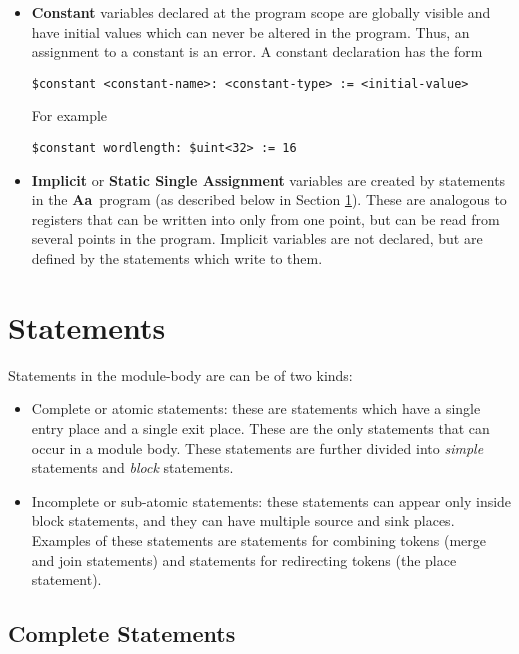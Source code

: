\documentclass{article}
\newcommand{\Aa}{{\bf Aa}~}
\begin{document}
\begin{itemize}
\item {\bf Constant} variables declared at
the program scope are globally visible and have
initial values which can never be altered in the program.
Thus, an assignment to a constant is an error.
A constant declaration has the form
\begin{verbatim}
$constant <constant-name>: <constant-type> := <initial-value>
\end{verbatim}
For example
\begin{verbatim}
$constant wordlength: $uint<32> := 16
\end{verbatim}
\item {\bf Implicit} or {\bf Static Single Assignment}
variables are created by statements in the \Aa program
(as described below in Section \ref{sec:Statements}).
These are analogous to registers that can be written
into only from one point,  but can be
read from several points in the program.
Implicit variables are not declared, but are defined
by the statements which write to them.
\end{itemize} 


\section{Statements} \label{sec:Statements}
 
Statements in the module-body are can be of two kinds:
\begin{itemize}
\item Complete or atomic statements: these are statements
which have a single
entry place and a single exit place.  These are
the only statements that can occur in a module body.
These statements are further divided into 
{\em simple} statements and {\em block} statements.
\item Incomplete or sub-atomic statements:  these statements
can appear only inside block statements,  and they
can have multiple source and sink places.
Examples of these statements are statements for
combining tokens (merge and join statements) and
statements for redirecting tokens (the place statement).
\end{itemize}


\subsection{Complete Statements}
\end{document}
